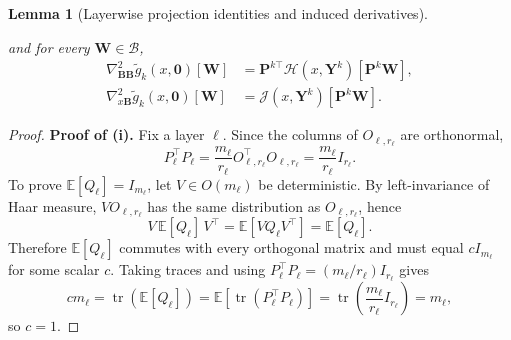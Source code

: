 \documentclass{pkumelon}
\theoremstyle{plain}
\newtheorem{lemma}{Lemma}
\newcommand{\E}{\mathbb{E}}
\DeclareMathOperator{\tr}{tr}
\begin{document}
\begin{lemma}[Layerwise projection identities and induced derivatives]
\begin{enumerate}
\begin{equation*}
\end{equation*}
and for every $\boldsymbol W\in\mathcal B$,
\begin{equation*}
\begin{aligned}
\nabla_{\boldsymbol B\boldsymbol B}^2\tilde g_k(x,\mathbf 0)[\boldsymbol W] &=\boldsymbol P^{k\top}\mathcal H(x,\boldsymbol Y^k)[\boldsymbol P^k\boldsymbol W], \\
\nabla_{x\boldsymbol B}^2\tilde g_k(x,\mathbf 0)[\boldsymbol W] &=\mathcal J(x,\boldsymbol Y^k)[\boldsymbol P^k\boldsymbol W].
\end{aligned}
\end{equation*}
\end{enumerate}
\end{lemma}

\begin{proof}
\textbf{Proof of (i). }
Fix a layer $\ell$. Since the columns of $O_{\ell,r_\ell}$ are orthonormal,
\begin{equation*}
P_\ell^\top P_\ell = \frac{m_\ell}{r_\ell}O_{\ell,r_\ell}^\top O_{\ell,r_\ell} = \frac{m_\ell}{r_\ell}I_{r_\ell}.
\end{equation*}
To prove $\E[Q_\ell]=I_{m_\ell}$, let $V\in O(m_\ell)$ be deterministic. By left-invariance of Haar measure, $VO_{\ell,r_\ell}$ has the same distribution as $O_{\ell,r_\ell}$, hence
\begin{equation*}
V\,\E[Q_\ell]\,V^\top=\E[VQ_\ell V^\top]=\E[Q_\ell].
\end{equation*}
Therefore $\E[Q_\ell]$ commutes with every orthogonal matrix and must equal $cI_{m_\ell}$ for some scalar $c$. Taking traces and using $P_\ell^\top P_\ell=(m_\ell/r_\ell)I_{r_\ell}$ gives
\begin{equation*}
cm_\ell = \tr(\E[Q_\ell]) = \E[\tr(P_\ell^\top P_\ell)] = \tr\!\left(\frac{m_\ell}{r_\ell}I_{r_\ell}\right) =m_\ell,
\end{equation*}
so $c=1$.


\end{proof}
\end{document}
